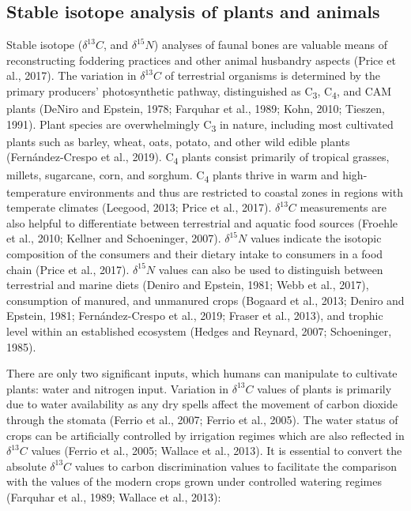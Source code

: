 \documentclass[3p]{elsarticle} %
\begin{document}
\hypertarget{stable-isotope-analysis-of-plants-and-animals}{%
\subsection{Stable isotope analysis of plants and animals}\label{stable-isotope-analysis-of-plants-and-animals}}

Stable isotope (\(\delta ^{13}C\), and \(\delta ^{15}N\)) analyses of faunal bones are valuable means of reconstructing foddering practices and other animal husbandry aspects (Price et al., 2017). The variation in \(\delta ^{13}C\) of terrestrial organisms is determined by the primary producers' photosynthetic pathway, distinguished as C\textsubscript{3}, C\textsubscript{4}, and CAM plants (DeNiro and Epstein, 1978; Farquhar et al., 1989; Kohn, 2010; Tieszen, 1991). Plant species are overwhelmingly C\textsubscript{3} in nature, including most cultivated plants such as barley, wheat, oats, potato, and other wild edible plants (Fernández-Crespo et al., 2019). C\textsubscript{4} plants consist primarily of tropical grasses, millets, sugarcane, corn, and sorghum. C\textsubscript{4} plants thrive in warm and high-temperature environments and thus are restricted to coastal zones in regions with temperate climates (Leegood, 2013; Price et al., 2017). \(\delta ^{13}C\) measurements are also helpful to differentiate between terrestrial and aquatic food sources (Froehle et al., 2010; Kellner and Schoeninger, 2007). \(\delta ^{15}N\) values indicate the isotopic composition of the consumers and their dietary intake to consumers in a food chain (Price et al., 2017). \(\delta ^{15}N\) values can also be used to distinguish between terrestrial and marine diets (Deniro and Epstein, 1981; Webb et al., 2017), consumption of manured, and unmanured crops (Bogaard et al., 2013; Deniro and Epstein, 1981; Fernández-Crespo et al., 2019; Fraser et al., 2013), and trophic level within an established ecosystem (Hedges and Reynard, 2007; Schoeninger, 1985).

There are only two significant inputs, which humans can manipulate to cultivate plants: water and nitrogen input. Variation in \(\delta ^{13}C\) values of plants is primarily due to water availability as any dry spells affect the movement of carbon dioxide through the stomata (Ferrio et al., 2007; Ferrio et al., 2005). The water status of crops can be artificially controlled by irrigation regimes which are also reflected in \(\delta ^{13}C\) values (Ferrio et al., 2005; Wallace et al., 2013). It is essential to convert the absolute \(\delta ^{13}C\) values to carbon discrimination values to facilitate the comparison with the values of the modern crops grown under controlled watering regimes (Farquhar et al., 1989; Wallace et al., 2013):
\end{document}
